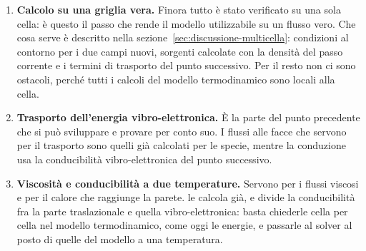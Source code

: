 \begin{enumerate}[leftmargin=1.8em]
  \item \textbf{Calcolo su una griglia vera.} Finora tutto è stato verificato
    su una sola cella: è questo il passo che rende il modello utilizzabile su
    un flusso vero. Che cosa serve è descritto nella
    sezione~\ref{sec:discussione-multicella}: condizioni al contorno per i due
    campi nuovi, sorgenti calcolate con la densità del passo corrente e i
    termini di trasporto del punto successivo. Per il resto non ci sono
    ostacoli, perché tutti i calcoli del modello termodinamico sono locali
    alla cella.
  \item \textbf{Trasporto dell'energia vibro-elettronica.} È la parte del
    punto precedente che si può sviluppare e provare per conto suo. I flussi
    alle facce che servono per il trasporto sono quelli già calcolati per le
    specie, mentre la conduzione usa la conducibilità vibro-elettronica del
    punto successivo.
  \item \textbf{Viscosità e conducibilità a due temperature.} Servono per i
    flussi viscosi e per il calore che raggiunge la parete. \mpp{} le calcola
    già, e divide la conducibilità fra la parte traslazionale e quella
    vibro-elettronica: basta chiederle cella per cella nel modello
    termodinamico, come oggi le energie, e passarle al solver al posto di
    quelle del modello a una temperatura.
\end{enumerate}
